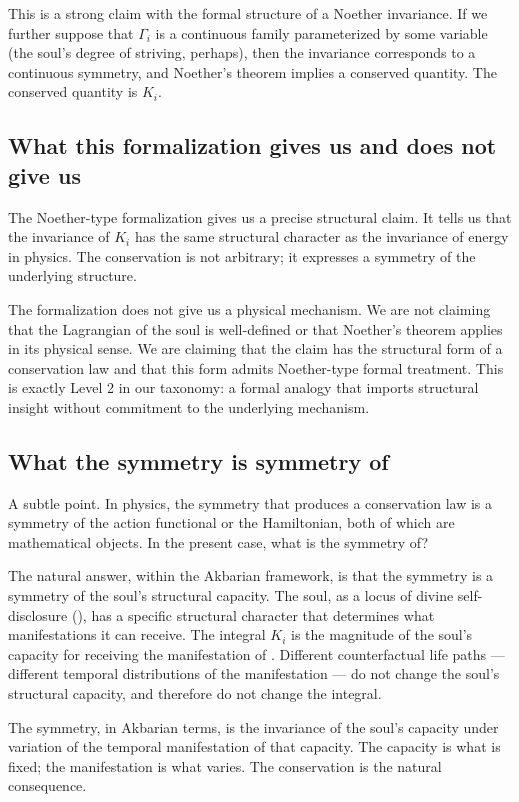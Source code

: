 This is a strong claim with the formal structure of a Noether
invariance. If we further suppose that $\Gamma_i$ is a continuous
family parameterized by some variable (the soul's degree of
striving, perhaps), then the invariance corresponds to a
continuous symmetry, and Noether's theorem implies a conserved
quantity. The conserved quantity is $K_i$.

\subsection{What this formalization gives us and does not give us}

The Noether-type formalization gives us a precise structural claim.
It tells us that the invariance of $K_i$ has the same structural
character as the invariance of energy in physics. The conservation
is not arbitrary; it expresses a symmetry of the underlying
structure.

The formalization does not give us a physical mechanism. We are not
claiming that the Lagrangian of the soul is well-defined or that
Noether's theorem applies in its physical sense. We are claiming
that the claim has the structural form of a conservation law and
that this form admits Noether-type formal treatment. This is
exactly Level 2 in our taxonomy: a formal analogy that imports
structural insight without commitment to the underlying mechanism.

\subsection{What the symmetry is symmetry of}

A subtle point. In physics, the symmetry that produces a conservation
law is a symmetry of the action functional or the Hamiltonian, both
of which are mathematical objects. In the present case, what is the
symmetry of?

The natural answer, within the Akbarian framework, is that the
symmetry is a symmetry of the soul's structural capacity. The soul,
as a locus of divine self-disclosure (), has a
specific structural character that determines what manifestations it
can receive. The integral $K_i$ is the magnitude of the soul's
capacity for receiving the manifestation of .
Different counterfactual life paths --- different temporal
distributions of the manifestation --- do not change the soul's
structural capacity, and therefore do not change the integral.

The symmetry, in Akbarian terms, is the invariance of the soul's
capacity under variation of the temporal manifestation of that
capacity. The capacity is what is fixed; the manifestation is what
varies. The conservation is the natural consequence.

